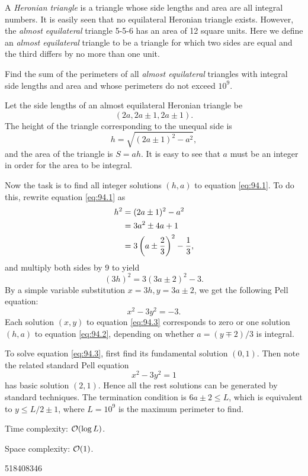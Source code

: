 




A \emph{Heronian triangle} is a triangle whose side lengths and area are all integral numbers. It is easily seen that no equilateral Heronian triangle exists. However, the \emph{almost equilateral} triangle 5-5-6 has an area of 12 square units. Here we define an \emph{almost equilateral} triangle to be a triangle for which two sides are equal and the third differs by no more than one unit.

Find the sum of the perimeters of all \emph{almost equilateral} triangles with integral side lengths and area and whose perimeters do not exceed $10^9$.

\solution

Let the side lengths of an almost equilateral Heronian triangle be
\[
(2a,2a \pm 1,2a \pm 1) .
\]
The height of the triangle corresponding to the unequal side is
\begin{equation}
h = \sqrt{(2a \pm 1)^2 - a^2}, \label{eq:94.1}
\end{equation}
and the area of the triangle is $S = ah$. It is easy to see that $a$ must be an integer in order for the area to be integral.

Now the task is to find all integer solutions $(h,a)$ to equation \eqref{eq:94.1}. To do this, rewrite equation \eqref{eq:94.1} as
\begin{align}
h^2 &= (2a \pm 1)^2 - a^2 \notag \\
&= 3a^2 \pm 4a + 1 \notag \\
&= 3 \left( a \pm \frac{2}{3} \right)^2 - \frac13 \notag ,
\end{align}
and multiply both sides by 9 to yield
\begin{equation}
(3h)^2 = 3(3a\pm 2)^2 - 3 . \label{eq:94.2}
\end{equation}
By a simple variable substitution $x = 3h, y = 3a \pm 2$, we get the following Pell equation:
\begin{equation}
x^2 - 3 y^2 = -3 . \label{eq:94.3}
\end{equation}
Each solution $(x,y)$ to equation \eqref{eq:94.3} corresponds to zero or one solution $(h,a)$ to equation \eqref{eq:94.2}, depending on whether $a = (y \mp 2) / 3$ is integral.

To solve equation \eqref{eq:94.3}, first find its fundamental solution $(0,1)$. Then note the related standard Pell equation
\[
x^2 - 3 y^2 = 1
\]
has basic solution $(2,1)$. Hence all the rest solutions can be generated by standard techniques. The termination condition is $6a \pm 2 \le L$, which is equivalent to $y \le L/2 \pm 1$, where $L = 10^9$ is the maximum perimeter to find.

\complexity

Time complexity: $\mathcal{O}(\log L)$.

Space complexity: $\mathcal{O}(1)$.

\answer

518408346



